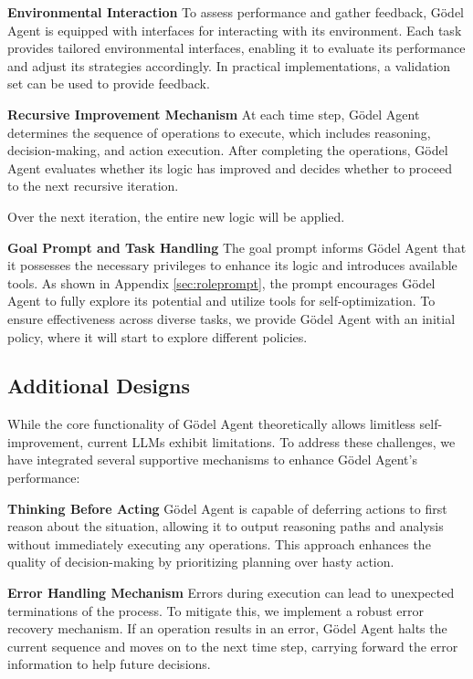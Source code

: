 \documentclass[11pt]{article}
\newcommand{\framework}{Gödel Agent\xspace}
\begin{document}
\noindent\textbf{Environmental Interaction} \quad
To assess performance and gather feedback, \framework is equipped with interfaces for interacting with its environment. Each task provides tailored environmental interfaces, enabling it to evaluate its performance and adjust its strategies accordingly. 
In practical implementations, a validation set can be used to provide feedback.


\noindent\textbf{Recursive Improvement Mechanism} \quad
At each time step, \framework determines the sequence of operations to execute, which includes reasoning, decision-making, and action execution. After completing the operations, \framework evaluates whether its logic has improved and decides whether to proceed to the next recursive iteration. 

Over the next iteration, the entire new logic will be applied.

\noindent\textbf{Goal Prompt and Task Handling} \quad
The goal prompt informs \framework that it possesses the necessary privileges to enhance its logic and introduces available tools. As shown in Appendix \ref{sec:roleprompt}, the prompt encourages \framework to fully explore its potential and utilize tools for self-optimization. To ensure effectiveness across diverse tasks, we provide \framework with an initial policy, where it will start to explore different policies.



\subsection{Additional Designs}
\label{sec:addi}
While the core functionality of \framework theoretically allows limitless self-improvement, current LLMs exhibit limitations. To address these challenges, we have integrated several supportive mechanisms to enhance \framework’s performance:





\noindent\textbf{Thinking Before Acting} \quad
\framework is capable of deferring actions to first reason about the situation, allowing it to output reasoning paths and analysis without immediately executing any operations. This approach enhances the quality of decision-making by prioritizing planning over hasty action.

\noindent\textbf{Error Handling Mechanism} \quad
Errors during execution can lead to unexpected terminations of the process. To mitigate this, we implement a robust error recovery mechanism. If an operation results in an error, \framework halts the current sequence and moves on to the next time step, carrying forward the error information to help future decisions.
\end{document}
